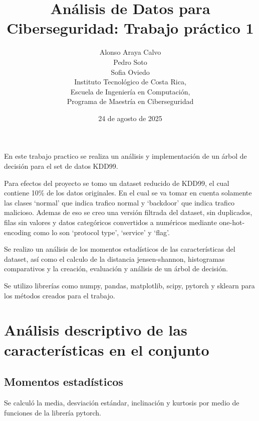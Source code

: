 \documentclass[12pt,a4paper]{article}
\begin{document}
\title{Análisis de Datos para Ciberseguridad: Trabajo práctico 1}

\author{
  Alonso Araya Calvo \\
  Pedro Soto \\
  Sofia Oviedo \\
  Instituto Tecnológico de Costa Rica, \\
  Escuela de Ingeniería en Computación, \\
  Programa de Maestría en Ciberseguridad
}

\date{ 24 de agosto de 2025 }
\maketitle

En este trabajo practico se realiza un análisis y implementación de un árbol de decisión para el set de datos KDD99.

Para efectos del proyecto se tomo un dataset reducido de KDD99, el cual contiene 10\% de los datos originales.
En el cual se va tomar en cuenta solamente las clases `normal' que indica trafico normal y `backdoor' que indica trafico malicioso.
Ademas de eso se creo una versión filtrada del dataset, sin duplicados, filas sin valores y datos categóricos convertidos a
numéricos mediante one-hot-encoding como lo son `protocol type', `service' y `flag'.

Se realizo un análisis de los momentos estadísticos de las características del dataset, así como el calculo de la distancia jensen-shannon,
histogramas comparativos y la creación, evaluación y análisis de un árbol de decisión.

Se utilizo librerías como numpy, pandas, matplotlib, scipy, pytorch y sklearn para los métodos creados para el trabajo.

\section{Análisis descriptivo de las características en el conjunto}\label{sec:analisis-descriptivo-de-las-caracteristicas-en-el-conjunto}

\subsection{Momentos estadísticos}\label{subsec:momentos-estadisticos}

Se calculó la media, desviación estándar, inclinación y kurtosis por medio de funciones de la librería pytorch.
\end{document}
